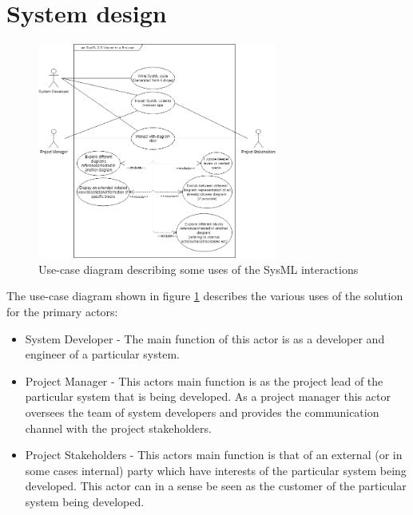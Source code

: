 \documentclass{article}
\begin{document}
\section{System design}

\begin{figure}[H]
    \begin{center}
        \includegraphics[width=0.7\textwidth]{Use-case_SysMLProject_first-draft.png}
        \caption{Use-case diagram describing some uses of the SysML interactions}
        \label{use-case}
    \end{center}
\end{figure}

The use-case diagram shown in figure \ref{use-case} describes the various uses of the solution for the primary actors: 
\begin{itemize}
  \item System Developer - The main function of this actor is as a developer and engineer of a particular system. 
  \item Project Manager - This actors main function is as the project lead of the particular system that is being developed. As a project manager this actor oversees the team of system developers and provides the communication channel with the project stakeholders.
  \item Project Stakeholders - This actors main function is that of an external (or in some cases internal) party which have interests of the particular system being developed. This actor can in a sense be seen as the customer of the particular system being developed.
\end{itemize}
\end{document}
